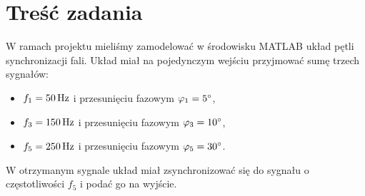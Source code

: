 \section{Treść zadania}
\label{sec:zadanie}

W ramach projektu mieliśmy zamodelować w środowisku MATLAB układ pętli
synchronizacji fali. Układ miał na pojedynczym wejściu przyjmować sumę trzech
sygnałów:
\begin{itemize}[nosep]
    \item $f_1 = \unit[50]{Hz}$ i przesunięciu fazowym $\varphi_1 = 5^\circ$,
    \item $f_3 = \unit[150]{Hz}$ i przesunięciu fazowym $\varphi_3 = 10^\circ$,
    \item $f_5 = \unit[250]{Hz}$ i przesunięciu fazowym $\varphi_5 = 30^\circ$.
\end{itemize}
W otrzymanym sygnale układ miał zsynchronizować się do sygnału o częstotliwości
$f_5$ i podać go na wyjście.

